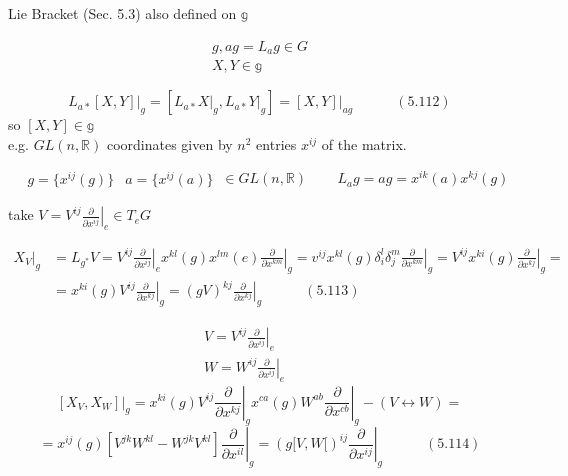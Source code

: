 \documentclass{book}
\begin{document}
Lie Bracket (Sec. 5.3) also defined on $\mathbb{g}$ 

\[
\begin{gathered}
  g, ag = L_ag \in G \\ 
  X,Y \in \mathbb{g}
\end{gathered}
\]

\begin{equation}
\left. L_{a*}[ X,Y]  \right|_g = [ L_{a*} \left. X \right|_g, L_{a*} \left. Y \right|_g ] = \left. [X,Y] \right|_{ag} \quad \quad \quad (5.112)
\end{equation}
so $[X,Y] \in \mathbb{g}$ \\

e.g. $GL(n,\mathbb{R})$ coordinates given by $n^2$ entries $x^{ij}$ of the matrix.  

\[
\begin{aligned}
  & g = \lbrace x^{ij}(g) \rbrace 
  & a = \lbrace x^{ij}(a) \rbrace
\end{aligned} \, \in GL(n, \mathbb{R}) \quad \quad \, L_a g = ag = x^{ik}(a) x^{kj}(g)
\]

take $V = V^{ij} \left. \frac{ \partial }{ \partial x^{ij} } \right|_e \in T_eG$ 

\begin{equation}
\begin{aligned}
  \left. X_V \right|_g & = L_{g^*} V = V^{ij} \left. \frac{ \partial }{ \partial x^{ij} } \right|_e x^{kl}(g) x^{lm}(e) \left. \frac{ \partial }{ \partial x^{km}} \right|_g = v^{ij} x^{kl}(g) \delta_i^l \delta^m_j \left. \frac{ \partial }{ \partial x^{km}} \right|_g = V^{ij} x^{ki}(g) \left. \frac{ \partial }{ \partial x^{kj} } \right|_g = \\
  & = x^{ki}(g) V^{ij} \left. \frac{ \partial }{ \partial x^{kj} } \right|_g = (gV)^{kj} \left. \frac{ \partial }{ \partial x^{kj} } \right|_g \quad \quad \quad (5.113)
\end{aligned}
\end{equation}

\[
\begin{aligned}
  & V = V^{ij} \left. \frac{ \partial }{ \partial x^{ij} } \right|_e \\ 
  &  W = W^{ij} \left. \frac{ \partial }{ \partial x^{ij} } \right|_e 
\end{aligned} \quad \quad \quad 
\]
\[
\left. [X_V, X_W ] \right|_g = x^{ki}(g) V^{ij} \left. \frac{ \partial }{ \partial x^{kj} } \right|_g x^{ca}(g) W^{ab} \left. \frac{ \partial }{ \partial x^{cb} } \right|_g - (V \leftrightarrow W ) = 
\]
\begin{equation}
  =  x^{ij}(g) [ V^{jk} W^{kl} - W^{jk} V^{kl} ] \left. \frac{ \partial }{ \partial x^{il} } \right|_g = ( g[V,W[)^{ij} \left. \frac{ \partial }{ \partial x^{ij} } \right|_g \quad \quad \quad (5.114)
\end{equation}
\end{document}
